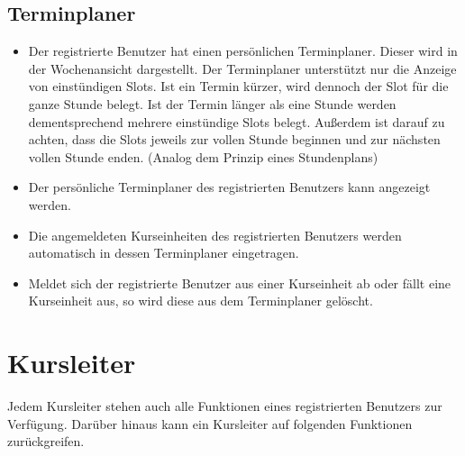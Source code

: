 \documentclass[a4paper]{scrreprt}
\newcounter{Lc}
\newcounter{Hc}
\newcommand{\stepHc}{\stepcounter{Hc}\setcounter{Lc}{0}}
\begin{document}
		\subsection{Terminplaner}
			\begin{itemize}
				\item {}
					Der registrierte Benutzer hat einen persönlichen Terminplaner. Dieser wird in der Wochenansicht dargestellt. Der Terminplaner unterstützt nur die Anzeige von einstündigen Slots. Ist ein Termin kürzer, wird dennoch der Slot für die ganze Stunde belegt. Ist der Termin länger als eine Stunde werden dementsprechend mehrere einstündige Slots belegt.
					Außerdem ist darauf zu achten, dass die Slots jeweils zur vollen Stunde beginnen und zur nächsten vollen Stunde enden. (Analog dem Prinzip eines Stundenplans)
				\item {}
					Der persönliche Terminplaner des registrierten Benutzers kann angezeigt werden. 
				\item {}
					Die angemeldeten Kurseinheiten des registrierten Benutzers werden automatisch in dessen Terminplaner eingetragen.
				\item {}	
					Meldet sich der registrierte Benutzer aus einer Kurseinheit ab oder fällt eine Kurseinheit aus, so wird diese aus dem Terminplaner gelöscht.
				\end{itemize}   

	\section{Kursleiter}
	Jedem Kursleiter stehen auch alle Funktionen eines registrierten Benutzers zur Verfügung. Darüber hinaus kann ein Kursleiter auf folgenden Funktionen zurückgreifen.
	\stepHc
\end{document}
